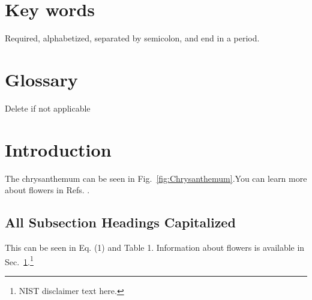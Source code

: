 \documentclass[12pt]{article}
\begin{document}
\section*{Key words}
\normalsize Required, alphabetized, separated by semicolon, and end in a period.\\
\pagebreak
\begin{center}
	\tableofcontents
	\listoftables
	\listoffigures
\end{center}
\pagebreak
\section*{Glossary}
Delete if not applicable\\
\pagebreak
\section{Introduction}
\label{sec:intro}
\normalsize The chrysanthemum can be seen in Fig.~\ref{fig:Chrysanthemum}.You can learn more about flowers in Refs. \cite{wilkinson_1990,Xiong2015,Prives2016,Roberts1982,Maloney2016,giancoli2008physics,Eston1993,MSU-CSE-06-2,Farindon,Marcheford,Joslin,Caxton,Isley,FIPS1402,SP80053r4}. 
\subsection{All Subsection Headings Capitalized}
\label{ssec:headingscap}
This can be seen in Eq. (1) and Table 1. Information about flowers is available in Sec.~\ref{sec:intro}.\footnote{NIST disclaimer text here.}
\end{document}
